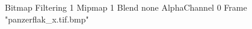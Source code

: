 {Bitmap
	{Filtering 1}
	{Mipmap 1}
	{Blend none}
	{AlphaChannel 0}
	{Frame "panzerflak_x.tif.bmp"}
}
